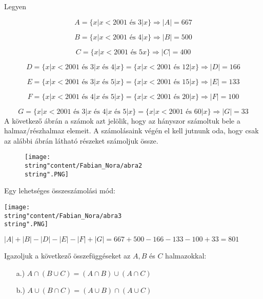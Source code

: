\begin{solution}
	Legyen
	
	\[
	A=\{x|x<2001\text{ és }3|x\}\Rightarrow|A|=667
	\]
	
	\[
	B=\{x|x<2001\text{ és }4|x\}\Rightarrow|B|=500
	\]
	
	\[
	C=\{x|x<2001\text{ és }5x\}\Rightarrow|C|=400
	\]
	
	\[
	D=\{x|x<2001\text{ és }3|x\text{ és }4|x\}=\{x|x<2001\text{ és }12|x\}\Rightarrow|D|=166
	\]
	
	\[
	E=\{x|x<2001\text{ és }3|x\text{ és }5|x\}=\{x|x<2001\text{ és }15|x\}\Rightarrow|E|=133
	\]
	
	\[
	F=\{x|x<2001\text{ és }4|x\text{ és }5|x\}=\{x|x<2001\text{ és }20|x\}\Rightarrow|F|=100
	\]
	
	\[
	G=\{x|x<2001\text{ és }3|x\text{ és }4|x\text{ és }5|x\}=\{x|x<2001\text{ és }60|x\}\Rightarrow|G|=33
	\]
	A következő ábrán a számok azt jelölik, hogy az hányszor számoltuk
	bele a halmaz/részhalmaz elemeit. A számolásaink végén el kell jutnunk
	oda, hogy csak az alábbi ábrán látható részeket számoljuk össze. 
	\begin{figure}[h]
		\centering \texttt{[image: \\string"content/Fabian\_Nora/abra2\\string".PNG]}
		\label{fig:enter-label} 
	\end{figure}
	
	Egy lehetséges összeszámolási mód: 
	\begin{center}
		\texttt{[image: \\string"content/Fabian\_Nora/abra3\\string".PNG]} 
		\par\end{center}
	$|A|+|B|-|D|-|E|-|F|+|G|=667+500-166-133-100+33=801$ 
\end{solution}
\begin{problem}
	Igazoljuk a következő összefüggéseket az $A,B$ és $C$ halmazokkal: 
	\begin{enumerate}
		\item[a.)] ${\displaystyle {A\cap(B\cup C)=(A\cap B)\cup(A\cap C)}}$ 
		\item[b.)] ${\displaystyle {A\cup(B\cap C)=(A\cup B)\cap(A\cup C)}}$ 
	\end{enumerate}
\end{problem}
